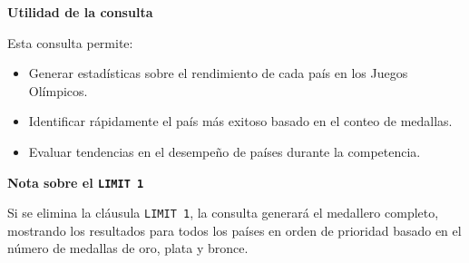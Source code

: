 \textbf{Utilidad de la consulta}

Esta consulta permite:
\begin{itemize}
    \item Generar estadísticas sobre el rendimiento de cada país en los Juegos Olímpicos.
    \item Identificar rápidamente el país más exitoso basado en el conteo de medallas.
    \item Evaluar tendencias en el desempeño de países durante la competencia.
\end{itemize}

\textbf{Nota sobre el \texttt{LIMIT 1}}

Si se elimina la cláusula \texttt{LIMIT 1}, la consulta generará el medallero completo, mostrando los resultados para todos los países en orden de prioridad basado en el número de medallas de oro, plata y bronce.
